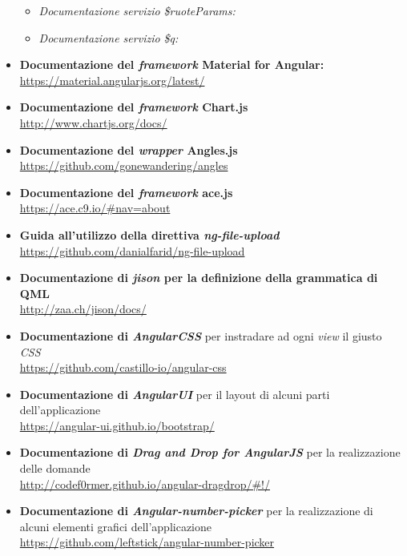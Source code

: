 \begin{itemize}
\begin{itemize}
			\item \textit{Documentazione servizio \$ruoteParams:} 
			\item \textit{Documentazione servizio \$q:} 
		\end{itemize}
	\item \textbf{Documentazione del \textit{framework} Material for Angular:} \\
		\url{https://material.angularjs.org/latest/}
	\item \textbf{Documentazione del \textit{framework} Chart.js} \\
		\url{http://www.chartjs.org/docs/}
	\item \textbf{Documentazione del \textit{wrapper} Angles.js} \\
		\url{https://github.com/gonewandering/angles}
	\item \textbf{Documentazione del \textit{framework} ace.js} \\
		\url{https://ace.c9.io/#nav=about}
	\item \textbf{Guida all'utilizzo della direttiva \textit{ng-file-upload}} \\
		\url{https://github.com/danialfarid/ng-file-upload}
	\item \textbf{Documentazione di \textit{jison} per la definizione della grammatica di QML} \\
		\url{http://zaa.ch/jison/docs/}
	\item \textbf{Documentazione di \textit{AngularCSS}} per instradare ad ogni \textit{view} il giusto \textit{CSS} \\
		\url{https://github.com/castillo-io/angular-css}
	\item \textbf{Documentazione di \textit{AngularUI}} per il layout di alcuni parti dell'applicazione \\
		\url{https://angular-ui.github.io/bootstrap/}
	\item \textbf{Documentazione di \textit{Drag and Drop for AngularJS}} per la realizzazione delle domande \\
		\url{http://codef0rmer.github.io/angular-dragdrop/#!/}
	\item \textbf{Documentazione di \textit{Angular-number-picker}} per la realizzazione di alcuni elementi grafici dell'applicazione \\
		\url{https://github.com/leftstick/angular-number-picker}
\end{itemize}
